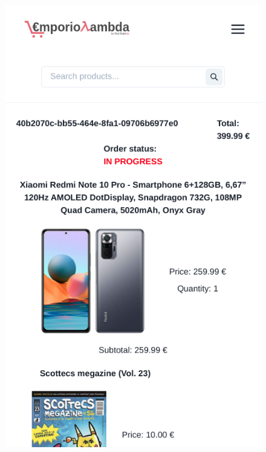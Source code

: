 \begin{itemize}
\begin{figure}[!ht]
              \vspace{10px}
              \includegraphics[scale=0.5]{../../../../Images/userManual/oderMobileDetail.png}
              \centering
          \end{figure}

\end{itemize}
